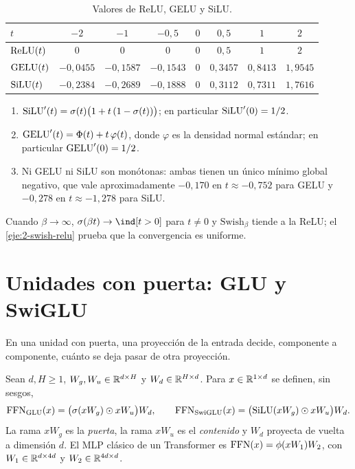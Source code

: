 \begin{table}[h]
\centering\small
\caption{Valores de ReLU, GELU y SiLU.}\label{tab:activaciones}
\begin{tabular}{@{}lccccccc@{}}
\toprule
$t$ & $-2$ & $-1$ & $-0{,}5$ & $0$ & $0{,}5$ & $1$ & $2$ \\
\midrule
$\operatorname{ReLU}(t)$ & $0$ & $0$ & $0$ & $0$ & $0{,}5$ & $1$ & $2$ \\
$\operatorname{GELU}(t)$ & $-0{,}0455$ & $-0{,}1587$ & $-0{,}1543$ & $0$ & $0{,}3457$ & $0{,}8413$ & $1{,}9545$ \\
$\operatorname{SiLU}(t)$ & $-0{,}2384$ & $-0{,}2689$ & $-0{,}1888$ & $0$ & $0{,}3112$ & $0{,}7311$ & $1{,}7616$ \\
\bottomrule
\end{tabular}
\end{table}

\begin{proposicion}\label{prop:silu}
\begin{enumerate}
  \item $\operatorname{SiLU}'(t)=\sigma(t)\bigl(1+t\,(1-\sigma(t))\bigr)$; en particular $\operatorname{SiLU}'(0)=1/2$.
  \item $\operatorname{GELU}'(t)=\Phi(t)+t\,\varphi(t)$, donde $\varphi$ es la densidad normal estándar; en particular $\operatorname{GELU}'(0)=1/2$.
  \item Ni GELU ni SiLU son monótonas: ambas tienen un único mínimo global negativo, que vale aproximadamente $-0{,}170$ en $t\approx-0{,}752$ para GELU y $-0{,}278$ en $t\approx-1{,}278$ para SiLU.
\end{enumerate}
\end{proposicion}

Cuando $\beta\to\infty$, $\sigma(\beta t)\to\ind[t>0]$ para $t\neq 0$ y $\mathrm{Swish}_\beta$ tiende a la ReLU; el \cref{eje:2-swish-relu} prueba que la convergencia es uniforme.

\section{Unidades con puerta: GLU y SwiGLU}

En una unidad con puerta, una proyección de la entrada decide, componente a componente, cuánto se deja pasar de otra proyección.

\begin{definicion}\label{def:swiglu}
Sean $d,H\ge 1$, $W_g,W_u\in\mathbb{R}^{d\times H}$ y $W_d\in\mathbb{R}^{H\times d}$. Para $x\in\mathbb{R}^{1\times d}$ se definen, sin sesgos,
\[
\operatorname{FFN}_{\mathrm{GLU}}(x)=\bigl(\sigma(xW_g)\odot xW_u\bigr)W_d,\qquad
\operatorname{FFN}_{\mathrm{SwiGLU}}(x)=\bigl(\operatorname{SiLU}(xW_g)\odot xW_u\bigr)W_d.
\]
La rama $xW_g$ es la \emph{puerta}, la rama $xW_u$ es el \emph{contenido} y $W_d$ proyecta de vuelta a dimensión $d$. El MLP clásico de un Transformer es $\operatorname{FFN}(x)=\phi(xW_1)W_2$, con $W_1\in\mathbb{R}^{d\times 4d}$ y $W_2\in\mathbb{R}^{4d\times d}$.
\end{definicion}

